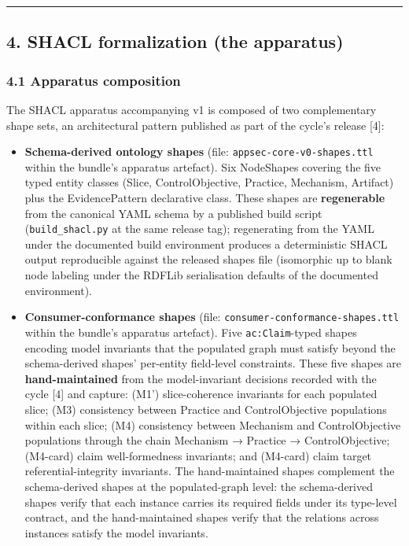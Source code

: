 \documentclass[
]{article}
\providecommand{\tightlist}{%
  \setlength{\itemsep}{0pt}\setlength{\parskip}{0pt}}
\begin{document}
\begin{center}\rule{0.5\linewidth}{0.5pt}\end{center}

\subsection{4. SHACL formalization (the
apparatus)}\label{shacl-formalization-the-apparatus}

\subsubsection{4.1 Apparatus composition}\label{apparatus-composition}

The SHACL apparatus accompanying v1 is composed of two complementary
shape sets, an architectural pattern published as part of the cycle's
release {[}4{]}:

\begin{itemize}
\tightlist
\item
  \textbf{Schema-derived ontology shapes} (file:
  \texttt{appsec-core-v0-shapes.ttl} within the bundle's apparatus
  artefact). Six NodeShapes covering the five typed entity classes
  (Slice, ControlObjective, Practice, Mechanism, Artifact) plus the
  EvidencePattern declarative class. These shapes are
  \textbf{regenerable} from the canonical YAML schema by a published
  build script (\texttt{build\_shacl.py} at the same release tag);
  regenerating from the YAML under the documented build environment
  produces a deterministic SHACL output reproducible against the
  released shapes file (isomorphic up to blank node labeling under the
  RDFLib serialisation defaults of the documented environment).
\item
  \textbf{Consumer-conformance shapes} (file:
  \texttt{consumer-conformance-shapes.ttl} within the bundle's apparatus
  artefact). Five \texttt{ac:Claim}-typed shapes encoding model
  invariants that the populated graph must satisfy beyond the
  schema-derived shapes' per-entity field-level constraints. These five
  shapes are \textbf{hand-maintained} from the model-invariant decisions
  recorded with the cycle {[}4{]} and capture: (M1') slice-coherence
  invariants for each populated slice; (M3) consistency between Practice
  and ControlObjective populations within each slice; (M4) consistency
  between Mechanism and ControlObjective populations through the chain
  Mechanism → Practice → ControlObjective; (M4-card) claim
  well-formedness invariants; and (M4-card) claim target
  referential-integrity invariants. The hand-maintained shapes
  complement the schema-derived shapes at the populated-graph level: the
  schema-derived shapes verify that each instance carries its required
  fields under its type-level contract, and the hand-maintained shapes
  verify that the relations across instances satisfy the model
  invariants.
\end{itemize}
\end{document}
